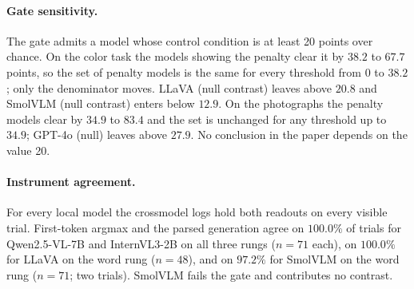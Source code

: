 \paragraph{Gate sensitivity.} The gate admits a model whose control condition
is at least 20 points over chance. On the color task the models showing the
penalty clear it by $38.2$ to $67.7$ points, so the set of penalty models is the
same for every threshold from $0$ to $38.2$; only the denominator moves. LLaVA
(null contrast) leaves above $20.8$ and SmolVLM (null contrast) enters below
$12.9$. On the photographs the penalty models clear by $34.9$ to $83.4$ and the
set is unchanged for any threshold up to $34.9$; GPT-4o (null) leaves above
$27.9$. No conclusion in the paper depends on the value 20.

\paragraph{Instrument agreement.} For every local model the crossmodel logs
hold both readouts on every visible trial. First-token argmax and the parsed
generation agree on $100.0\%$ of trials for Qwen2.5-VL-7B and InternVL3-2B on all
three rungs ($n=71$ each), on $100.0\%$ for LLaVA on the word rung ($n=48$), and
on $97.2\%$ for SmolVLM on the word rung ($n=71$; two trials). SmolVLM fails the
gate and contributes no contrast.
